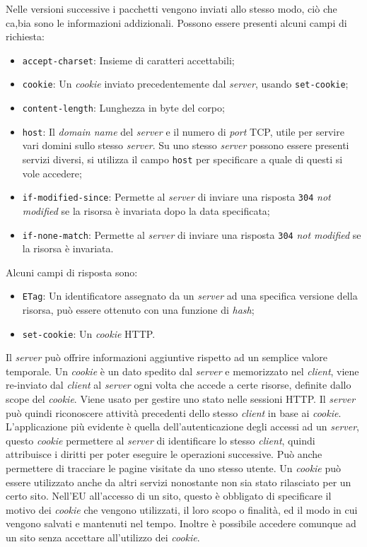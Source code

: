 \documentclass{article}
\numberwithin{equation}{subsection}
\begin{document}
Nelle versioni successive i pacchetti vengono inviati allo stesso modo, ciò che ca,bia sono le informazioni addizionali. 
Possono essere presenti alcuni campi di richiesta:
\begin{itemize}
    \item \verb|accept-charset|: Insieme di caratteri accettabili;
    \item \verb|cookie|: Un \textit{cookie} inviato precedentemente dal \textit{server}, usando \verb|set-cookie|;
    \item \verb|content-length|: Lunghezza in byte del corpo;
    \item \verb|host|: Il \textit{domain name} del \textit{server} e il numero di \textit{port} \textcolor{Bittersweet}{TCP}, utile per servire vari domini sullo stesso \textit{server}. Su uno stesso \textit{server} possono essere presenti servizi diversi, si utilizza il campo \verb|host| per specificare a quale di questi si vole accedere;
    \item \verb|if-modified-since|: Permette al \textit{server} di inviare una risposta \verb|304| \textit{not modified} se la risorsa è invariata dopo la data specificata; 
    \item \verb|if-none-match|: Permette al \textit{server} di inviare una risposta \verb|304| \textit{not modified} se la risorsa è invariata. 
\end{itemize}
Alcuni campi di risposta sono:
\begin{itemize}
    \item \verb|ETag|: Un identificatore assegnato da un \textit{server} ad una specifica versione della risorsa, può essere ottenuto con una funzione di \textit{hash};
    \item \verb|set-cookie|: Un \textit{cookie} \textcolor{NavyBlue}{HTTP}. 
\end{itemize}
Il \textit{server} può 
offrire informazioni aggiuntive rispetto ad un semplice valore temporale. 
Un \textit{cookie} è un dato spedito dal \textit{server} e memorizzato nel \textit{client}, viene re-inviato dal \textit{client} al \textit{server} ogni volta che accede a certe risorse, definite dallo scope del \textit{cookie}. 
Viene usato per gestire uno stato nelle sessioni \textcolor{NavyBlue}{HTTP}. Il \textit{server} può quindi riconoscere attività precedenti dello stesso \textit{client} in base ai \textit{cookie}. 
L'applicazione più evidente è quella dell'autenticazione degli accessi ad un \textit{server}, questo \textit{cookie} permettere al \textit{server} di identificare lo stesso \textit{client}, quindi attribuisce 
i diritti per poter eseguire le operazioni successive. 
Può anche permettere di tracciare le pagine visitate da uno stesso utente. Un \textit{cookie} può essere utilizzato anche da altri servizi nonostante non sia stato rilasciato per 
un certo sito. Nell'EU all'accesso di un sito, questo è obbligato di specificare il motivo dei \textit{cookie} che vengono utilizzati, il loro scopo o finalità, ed il modo in cui 
vengono salvati e mantenuti nel tempo. Inoltre è possibile accedere comunque ad un sito senza accettare all'utilizzo dei \textit{cookie}. 
\end{document}
